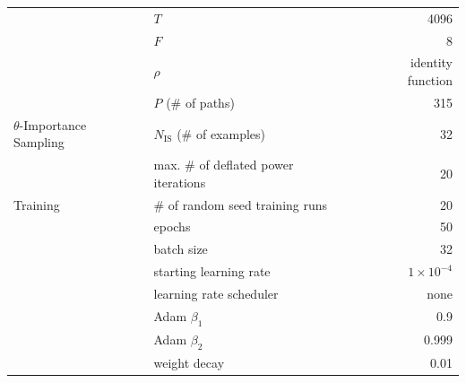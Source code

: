 \documentclass{article} %
\theoremstyle{plain}
\theoremstyle{definition}
\theoremstyle{remark}
\begin{document}
\begin{table}[H]
\begin{tabular}{
    llr
}
    & $T$ & 4096 \\
    & $F$ & 8 \\
    & $\rho$ & identity function \\
    & $P$ (\# of paths) & 315 \\
    \midrule
    $\theta$-Importance Sampling & $N_{\mathrm{IS}}$ (\# of examples) & 32 \\
    & max. \# of deflated power iterations & 20 \\
    \midrule
    Training & \# of random seed training runs & 20 \\
    & epochs & 50 \\
    & batch size & 32 \\
    & starting learning rate & $1 \times 10^{-4}$ \\
    & learning rate scheduler & none \\
    & Adam $\beta_1$ & 0.9 \\
    & Adam $\beta_2$ & 0.999 \\
    & weight decay & 0.01 \\
    \bottomrule
\end{tabular}
\end{table}

\clearpage
\end{document}
